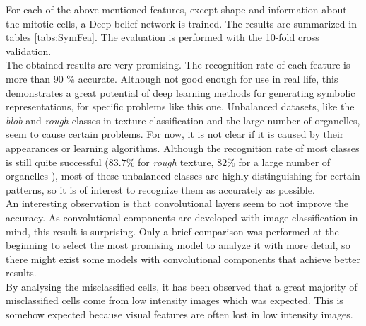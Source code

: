 For each of the above mentioned features, except shape and information about the mitotic cells, a Deep belief network is trained.  The results are summarized in tables \ref{tabs:SymFea}. The evaluation is performed with  the 10-fold cross validation. \\

The obtained results are very promising. The recognition rate of each feature is more than 90 \% accurate. Although not good enough for use in real life, this demonstrates a great potential of deep learning methods for generating symbolic representations, for specific problems like this one. Unbalanced datasets, like the \textit{blob} and \textit{rough} classes in texture classification and the large number of organelles, seem to cause certain problems. For now, it is not clear if it is caused by their appearances or learning algorithms. Although the recognition rate of most classes is still quite successful ($ 83.7 \%$ for \textit{rough} texture, $82 \%$ for a large number of organelles ),  most of these unbalanced classes are highly distinguishing for certain patterns, so it is of interest to recognize them as accurately as possible. \\

An interesting observation is that convolutional layers seem to not improve the accuracy. As convolutional components are developed with image classification in mind, this result is surprising. Only a brief comparison was performed at the beginning to select the most promising model to analyze it with more detail, so there might exist some models with convolutional components that achieve better results. \\

By analysing the misclassified cells, it has been observed that a great majority of misclassified cells come from low intensity images which was expected. This is somehow expected because visual features are often lost in low intensity images. 

